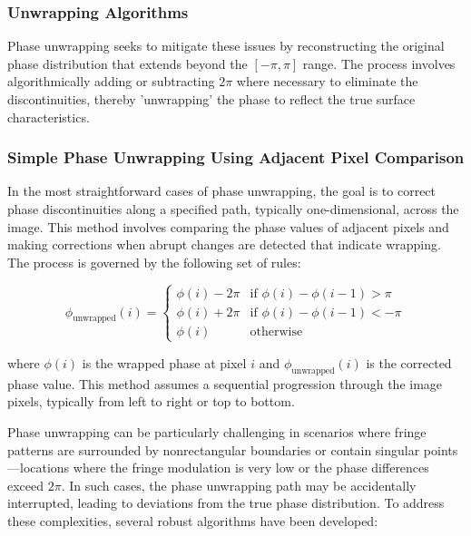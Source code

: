 \documentclass[../main.tex]{subfiles}
\begin{document}
\newpage
\begin{minipage}{\textwidth}
\subsubsection{Unwrapping Algorithms}
Phase unwrapping seeks to mitigate these issues by reconstructing the original phase distribution that extends beyond the $[-\pi, \pi]$ range. The process involves algorithmically adding or subtracting $2\pi$ where necessary to eliminate the discontinuities, thereby 'unwrapping' the phase to reflect the true surface characteristics.

\subsubsection{Simple Phase Unwrapping Using Adjacent Pixel Comparison}
In the most straightforward cases of phase unwrapping, the goal is to correct phase discontinuities along a specified path, typically one-dimensional, across the image. This method involves comparing the phase values of adjacent pixels and making corrections when abrupt changes are detected that indicate wrapping. The process is governed by the following set of rules:

\begin{equation}
    \phi_{\text{unwrapped}}(i) = 
    \begin{cases} 
    \phi(i) - 2\pi & \text{if } \phi(i) - \phi(i-1) > \pi \\
    \phi(i) + 2\pi & \text{if } \phi(i) - \phi(i-1) < -\pi \\
    \phi(i) & \text{otherwise}
    \end{cases}
\end{equation}

where \( \phi(i) \) is the wrapped phase at pixel \( i \) and \( \phi_{\text{unwrapped}}(i) \) is the corrected phase value. This method assumes a sequential progression through the image pixels, typically from left to right or top to bottom.

Phase unwrapping can be particularly challenging in scenarios where fringe patterns are surrounded by nonrectangular boundaries or contain singular points—locations where the fringe modulation is very low or the phase differences exceed \(2\pi\). In such cases, the phase unwrapping path may be accidentally interrupted, leading to deviations from the true phase distribution. To address these complexities, several robust algorithms have been developed:


\end{minipage}
\end{document}
